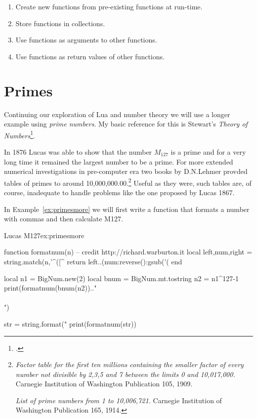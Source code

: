 \begin{enumerate}
\item Create new functions from pre-existing functions at run-time.
\item Store functions in collections.
\item Use functions as arguments to other functions.
\item Use functions as return values of other functions.
\end{enumerate}

\section*{Primes}

Continuing our exploration of Lua and number theory we will use a longer example using \textit{prime numbers}. My basic reference for this is Stewart's \textit{Theory of Numbers}\footcite{stewart1964}.

In 1876 Lucas was able to show that the number $M_{127}$ is a prime and for a very long time it remained the largest number to be a prime. For more extended numerical investigations in pre-computer era two books by D.N.Lehmer provded
tables of primes to around 10,000,000.00.\footnote{\textit{Factor table for the first ten millions containing the smaller factor of every number not divisible by 2,3,5 and 7 between the limits 0 and 10,017,000.} Carnegie Institution of Washington Publication 105, 1909.\par \textit{List of prime numbers from 1 to 10,006,721.} Carnegie Institution of Washington Publication 165, 1914.} Useful  as they were, such tables are, of course, inadequate to handle problems like the one proposed by Lucas 1867.

In Example~\ref{ex:primesmore} we will first write a function that formats a number with commas and then calculate 
M127.

\begin{texexample}{Lucas M127}{ex:primesmore}
\begin{luacode}
function formatnum(n) -- credit http://richard.warburton.it
	local left,num,right = string.match(n,'^([^%
	return left..(num:reverse():gsub('(%
end

local n1 = BigNum.new(2)
local bnum = BigNum.mt.tostring
n2 = n1^127-1
print(formatnum(bnum(n2)).."\\\\")

str = string.format("%
print(formatnum(str))
\end{luacode}
\end{texexample}

